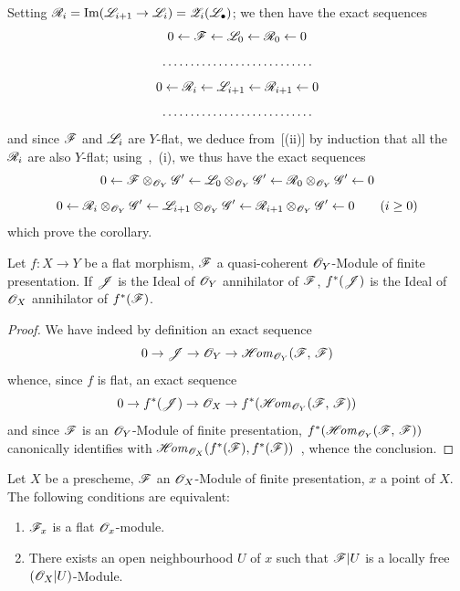 Setting $\mathscr{R}_i=\operatorname{Im}(\mathscr{L}_{i+1}\to\mathscr{L}_i)=\mathscr{Z}_i(\mathscr{L}_\bullet)$; we then have the exact sequences
\[
  0\leftarrow\mathscr{F}\leftarrow\mathscr{L}_0\leftarrow\mathscr{R}_0\leftarrow 0
\]
\[
\hbox to 12em{\dotfill}
\]
\[
  0\leftarrow\mathscr{R}_i\leftarrow\mathscr{L}_{i+1}\leftarrow\mathscr{R}_{i+1}\leftarrow 0
\]
\[
\hbox to 12em{\dotfill}
\]
and since $\mathscr{F}$ and $\mathscr{L}_i$ are $Y$-flat, we deduce from~[\textup{(ii)}] by induction that all the $\mathscr{R}_i$ are also $Y$-flat; using~,~(i), we thus have the exact sequences
\[
  0\leftarrow\mathscr{F}\otimes_{\mathscr{O}_Y}\mathscr{G}'\leftarrow\mathscr{L}_0\otimes_{\mathscr{O}_Y}\mathscr{G}'\leftarrow\mathscr{R}_0\otimes_{\mathscr{O}_Y}\mathscr{G}'\leftarrow 0
\]
\[
  0\leftarrow\mathscr{R}_i\otimes_{\mathscr{O}_Y}\mathscr{G}'\leftarrow\mathscr{L}_{i+1}\otimes_{\mathscr{O}_Y}\mathscr{G}'\leftarrow\mathscr{R}_{i+1}\otimes_{\mathscr{O}_Y}\mathscr{G}'\leftarrow 0 \qquad (i\geq 0)
\]
which prove the corollary.

\begin{proposition}[2.1.11]
\label{IV.2.1.11}
Let $f:X\to Y$ be a flat morphism, $\mathscr{F}$ a quasi-coherent $\mathscr{O}_Y$-Module of finite presentation.
If $\mathscr{J}$ is the Ideal of $\mathscr{O}_Y$ annihilator of $\mathscr{F}$, $f^*(\mathscr{J})$ is the Ideal of $\mathscr{O}_X$ annihilator of $f^*(\mathscr{F})$.
\end{proposition}

\begin{proof}
We have indeed by definition an exact sequence~
\[
  0\to\mathscr{J}\to\mathscr{O}_Y\to\mathscr{H}\!\mathit{om}_{\mathscr{O}_Y}(\mathscr{F},\,\mathscr{F})
\]
whence, since $f$ is flat, an exact sequence
\[
  0\to f^*(\mathscr{J})\to\mathscr{O}_X\to f^*(\mathscr{H}\!\mathit{om}_{\mathscr{O}_Y}(\mathscr{F},\,\mathscr{F}))
\]
and since $\mathscr{F}$ is an $\mathscr{O}_Y$-Module of finite presentation, $f^*(\mathscr{H}\!\mathit{om}_{\mathscr{O}_Y}(\mathscr{F},\,\mathscr{F}))$ canonically identifies with $\mathscr{H}\!\mathit{om}_{\mathscr{O}_X}(f^*(\mathscr{F}),f^*(\mathscr{F}))$~, whence the conclusion.
\end{proof}

\begin{proposition}[2.1.12]
\label{IV.2.1.12}
Let $X$ be a prescheme, $\mathscr{F}$ an $\mathscr{O}_X$-Module of finite presentation, $x$ a point of $X$.
The following conditions are equivalent:
\begin{enumerate}
  \item[\emph{a)}] $\mathscr{F}_x$ is a flat $\mathscr{O}_x$-module.
  \item[\emph{b)}] There exists an open neighbourhood $U$ of $x$ such that $\mathscr{F}|U$ is a locally free $(\mathscr{O}_X|U)$-Module.
\end{enumerate}
\end{proposition}

